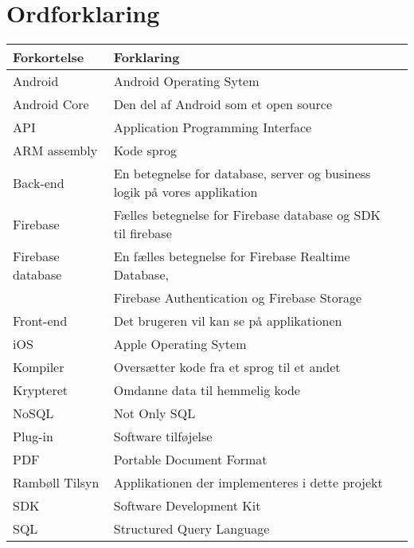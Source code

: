 \chapter*{Ordforklaring}

\begin{tabularx}{\textwidth}{l l X} \hline
	\textbf{Forkortelse}  & \textbf{Forklaring} \\ \hline
	Android& Android Operating Sytem \\
	Android Core& Den del af Android som et open source& \\
	API& Application Programming Interface \\
	ARM assembly& Kode sprog \\
	Back-end& En betegnelse for database, server og business logik på vores applikation \\
	Firebase& Fælles betegnelse for Firebase database og SDK til firebase\\
	Firebase database& En fælles betegnelse for Firebase Realtime Database,\\
	& Firebase Authentication og Firebase Storage& \\
	Front-end& Det brugeren vil kan se på applikationen \\
	iOS&  Apple Operating Sytem \\
	Kompiler& Oversætter kode fra et sprog til et andet \\
	Krypteret& Omdanne data til hemmelig kode& \\
	NoSQL & Not Only SQL \\
	Plug-in&  Software tilføjelse \\
	PDF& Portable Document Format \\
	Rambøll Tilsyn& Applikationen der implementeres i dette projekt\\
	SDK& Software Development Kit\\
	SQL&  Structured Query Language \\
	
\end{tabularx}